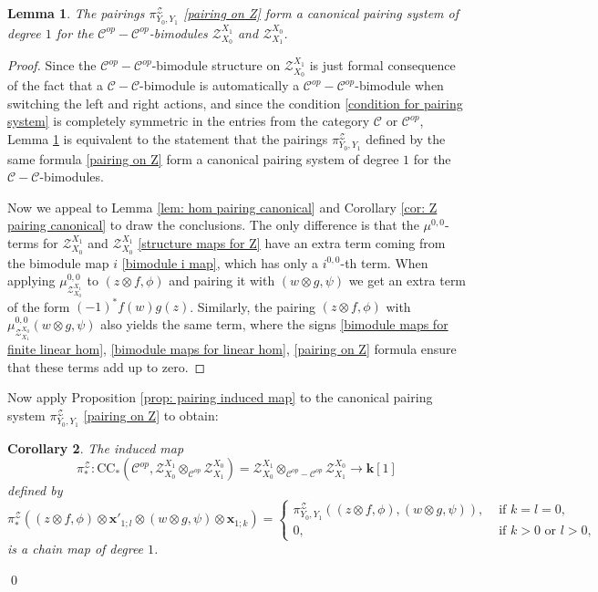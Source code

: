 \documentclass[11pt]{amsproc}
\def\K{{\mathbf{k}}}
\def\cZ{\mathcal{Z}}
\def\cc{\mathcal{C}}
\def\r#1{\mathrm{#1}}
\newtheorem{lem}{Lemma}[section]
\newtheorem{cor}[lem]{Corollary}
\theoremstyle{remark}
\numberwithin{equation}{section}
\begin{document}
\begin{lem}\label{lem: pairing on Z canonical}
The pairings $\pi^{\cZ}_{Y_{0}, Y_{1}}$ \eqref{pairing on Z} form a canonical pairing system of degree $1$ for the $\cc^{op} - \cc^{op}$-bimodules $\cZ_{X_{0}}^{X_{1}}$ and $\cZ_{X_{1}}^{X_{0}}$.
\end{lem}
\begin{proof}
Since the $\cc^{op}-\cc^{op}$-bimodule structure on $\cZ_{X_{0}}^{X_{1}}$ is just formal consequence of the fact that a $\cc-\cc$-bimodule is automatically a $\cc^{op}-\cc^{op}$-bimodule when switching the left and right actions, 
and since the condition \eqref{condition for pairing system} is completely symmetric in the entries from the category $\cc$ or $\cc^{op}$, 
Lemma \ref{lem: pairing on Z canonical} is equivalent to the statement that the pairings $\pi^{\cZ}_{Y_{0}, Y_{1}}$ defined by the same formula \eqref{pairing on Z} form a canonical pairing system of degree $1$ for the $\cc-\cc$-bimodules.

Now we appeal to Lemma \ref{lem: hom pairing canonical} and Corollary \ref{cor: Z pairing canonical} to draw the conclusions.
The only difference is that the $\mu^{0, 0}$-terms for $\cZ_{X_{0}}^{X_{1}}$ and $\cZ_{X_{0}}^{X_{1}}$ \eqref{structure maps for Z} have an extra term coming from the bimodule map $i$ \eqref{bimodule i map},
which has only a $i^{0, 0}$-th term. 
When applying $\mu^{0, 0}_{\cZ_{X_{0}}^{X_{1}}}$ to $(z \otimes f, \phi)$ and pairing it with $(w \otimes g, \psi)$ we get an extra term of the form $(-1)^{*} f(w)g(z)$.
Similarly, the pairing $(z \otimes f, \phi)$ with $\mu^{0, 0}_{\cZ_{X_{1}}^{X_{0}}}(w \otimes g, \psi)$ also yields the same term,
where the signs \eqref{bimodule maps for finite linear hom}, \eqref{bimodule maps for linear hom}, \eqref{pairing on Z} formula ensure that these terms add up to zero.
\end{proof}

Now apply Proposition \ref{prop: pairing induced map} to the canonical pairing system $\pi^{\cZ}_{Y_{0}, Y_{1}}$ \eqref{pairing on Z} to obtain:

\begin{cor}\label{cor: induced map on cc Z}
The induced map
\begin{equation}\label{induced map on cc Z}
\pi^{\cZ}_{*}: \r{CC}_{*}(\cc^{op}, \cZ_{X_{0}}^{X_{1}} \otimes_{\cc^{op}} \cZ_{X_{1}}^{X_{0}}) = \cZ_{X_{0}}^{X_{1}} \otimes_{\cc^{op}-\cc^{op}} \cZ_{X_{1}}^{X_{0}} \to \K[1]
\end{equation}
defined by 
\begin{equation}\label{induced map on cc Z formula}
\pi^{\cZ}_{*}((z \otimes f, \phi) \otimes \mathbf{x}'_{1;l} \otimes (w \otimes g, \psi) \otimes \mathbf{x}_{1;k}) = 
\begin{cases}
\pi^{\cZ}_{Y_{0}, Y_{1}}((z \otimes f, \phi), (w \otimes g, \psi)), & \text{ if } k=l=0, \\
0, & \text{ if } k > 0 \text{ or } l > 0,
\end{cases}
\end{equation}
is a chain map of degree $1$.
\end{cor} \qed
\end{document}
